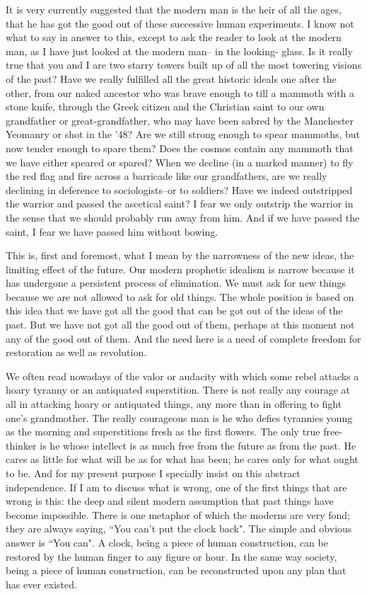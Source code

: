 \documentclass[final,10pt,letterpaper,twocolumn,openany]{book}
\begin{document}
It is very currently suggested that the modern man is the heir of all the
ages, that he has got the good out of these successive human experiments.
I know not what to say in answer to this, except to ask the reader to look at
the modern man, as I have just looked at the modern man-- in the looking-
glass. Is it really true that you and I are two starry towers built up of all the
most towering visions of the past? Have we really fulfilled all the great
historic ideals one after the other, from our naked ancestor who was brave
enough to till a mammoth with a stone knife, through the Greek citizen
and the Christian saint to our own grandfather or great-grandfather, who
may have been sabred by the Manchester Yeomanry or shot in the '48? Are
we still strong enough to spear mammoths, but now tender enough to
spare them? Does the cosmos contain any mammoth that we have either
speared or spared? When we decline (in a marked manner) to fly the red
flag and fire across a barricade like our grandfathers, are we really
declining in deference to sociologists--or to soldiers? Have we indeed
outstripped the warrior and passed the ascetical saint? I fear we only
outstrip the warrior in the sense that we should probably run away from
him. And if we have passed the saint, I fear we have passed him without
bowing.

This is, first and foremost, what I mean by the narrowness of the new
ideas, the limiting effect of the future. Our modern prophetic idealism is
narrow because it has undergone a persistent process of elimination. We
must ask for new things because we are not allowed to ask for old things.
The whole position is based on this idea that we have got all the good that
can be got out of the ideas of the past. But we have not got all the good out
of them, perhaps at this moment not any of the good out of them. And the
need here is a need of complete freedom for restoration as well as
revolution.

We often read nowadays of the valor or audacity with which some
rebel attacks a hoary tyranny or an antiquated superstition. There is not
really any courage at all in attacking hoary or antiquated things, any more
than in offering to fight one's grandmother. The really courageous man is
he who defies tyrannies young as the morning and superstitions fresh as
the first flowers. The only true free-thinker is he whose intellect is as
much free from the future as from the past. He cares as little for what will
be as for what has been; he cares only for what ought to be. And for my
present purpose I specially insist on this abstract independence. If I am to
discuss what is wrong, one of the first things that are wrong is this: the
deep and silent modern assumption that past things have become
impossible. There is one metaphor of which the moderns are very fond;
they are always saying, ``You can't put the clock back". The simple and
obvious answer is ``You can". A clock, being a piece of human
construction, can be restored by the human finger to any figure or hour. In
the same way society, being a piece of human construction, can be
reconstructed upon any plan that has ever existed.
\end{document}
